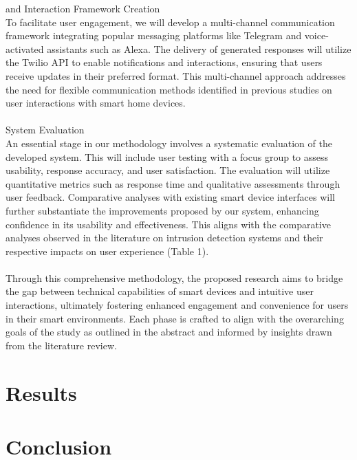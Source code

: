 \documentclass[conference]{IEEEtran}
\begin{document}
and Interaction Framework Creation\\To facilitate user engagement, we will develop a multi-channel communication framework integrating popular messaging platforms like Telegram and voice-activated assistants such as Alexa. The delivery of generated responses will utilize the Twilio API to enable notifications and interactions, ensuring that users receive updates in their preferred format. This multi-channel approach addresses the need for flexible communication methods identified in previous studies on user interactions with smart home devices.\\\\System Evaluation\\An essential stage in our methodology involves a systematic evaluation of the developed system. This will include user testing with a focus group to assess usability, response accuracy, and user satisfaction. The evaluation will utilize quantitative metrics such as response time and qualitative assessments through user feedback. Comparative analyses with existing smart device interfaces will further substantiate the improvements proposed by our system, enhancing confidence in its usability and effectiveness. This aligns with the comparative analyses observed in the literature on intrusion detection systems and their respective impacts on user experience (Table 1).\\\\Through this comprehensive methodology, the proposed research aims to bridge the gap between technical capabilities of smart devices and intuitive user interactions, ultimately fostering enhanced engagement and convenience for users in their smart environments. Each phase is crafted to align with the overarching goals of the study as outlined in the abstract and informed by insights drawn from the literature review.

\section{Results}


\section{Conclusion}
\end{document}
